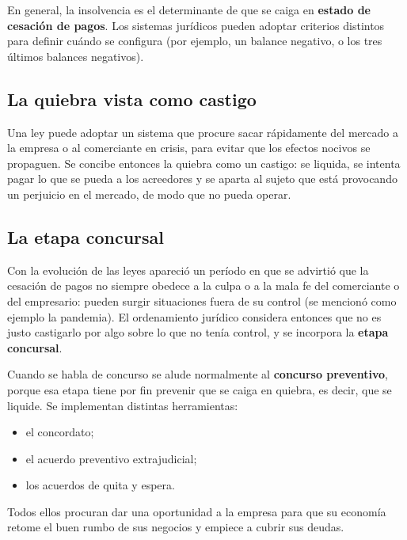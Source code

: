 \documentclass[12pt,oneside]{book}
\begin{document}
En general, la insolvencia es el determinante de que se caiga en \textbf{estado de cesación de pagos}. Los sistemas jurídicos pueden adoptar criterios distintos para definir cuándo se configura (por ejemplo, un balance negativo, o los tres últimos balances negativos).

\subsection{La quiebra vista como castigo}

Una ley puede adoptar un sistema que procure sacar rápidamente del mercado a la empresa o al comerciante en crisis, para evitar que los efectos nocivos se propaguen. Se concibe entonces la quiebra como un castigo: se liquida, se intenta pagar lo que se pueda a los acreedores y se aparta al sujeto que está provocando un perjuicio en el mercado, de modo que no pueda operar.

\subsection{La etapa concursal}

Con la evolución de las leyes apareció un período en que se advirtió que la cesación de pagos no siempre obedece a la culpa o a la mala fe del comerciante o del empresario: pueden surgir situaciones fuera de su control (se mencionó como ejemplo la pandemia). El ordenamiento jurídico considera entonces que no es justo castigarlo por algo sobre lo que no tenía control, y se incorpora la \textbf{etapa concursal}.

Cuando se habla de concurso se alude normalmente al \textbf{concurso preventivo}, porque esa etapa tiene por fin prevenir que se caiga en quiebra, es decir, que se liquide. Se implementan distintas herramientas:

\begin{itemize}
    \item el concordato;
    \item el acuerdo preventivo extrajudicial;
    \item los acuerdos de quita y espera.
\end{itemize}

Todos ellos procuran dar una oportunidad a la empresa para que su economía retome el buen rumbo de sus negocios y empiece a cubrir sus deudas.
\end{document}

